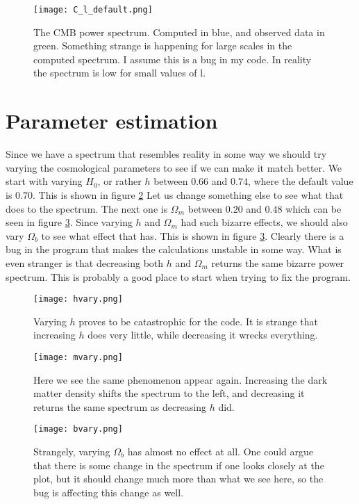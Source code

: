 \documentclass[a4paper]{report}
\begin{document}
\begin{figure}[ht]
 \texttt{[image: C\_l\_default.png]}
 \caption{The CMB power spectrum. Computed in blue, and observed data in green. Something strange is happening for large scales in the computed spectrum. I assume this is a bug in my code. In reality the spectrum is low for small values of l.}
 \label{fig:Cl}
\end{figure}

\section{Parameter estimation}\label{sec:param}
Since we have a spectrum that resembles reality in some way we should try varying the cosmological parameters to see if we can make it match better. We start with varying $H_0$, or rather $h$ between $0.66$ and $0.74$, where the default value is $0.70$. This is shown in figure \ref{fig:hvary}
Let us change something else to see what that does to the spectrum. The next one is $\Omega_m$ between $0.20$ and $0.48$ which can be seen in figure \ref{fig:mvary}.
Since varying $h$ and $\Omega_m$ had such bizarre effects, we should also vary $\Omega_b$ to see what effect that has. This is shown in figure \ref{fig:mvary}. Clearly there is a bug in the program that makes the calculations unstable in some way. What is even stranger is that decreasing both $h$ and $\Omega_m$ returns the same bizarre power spectrum. This is probably a good place to start when trying to fix the program.

\begin{figure}[ht]
 \texttt{[image: hvary.png]}
 \caption{Varying $h$ proves to be catastrophic for the code. It is strange that increasing $h$ does very little, while decreasing it wrecks everything.}
 \label{fig:hvary}
\end{figure}


\begin{figure}[ht]
 \texttt{[image: mvary.png]}
 \caption{Here we see the same phenomenon appear again. Increasing the dark matter density shifts the spectrum to the left, and decreasing it returns the same spectrum as decreasing $h$ did.}
 \label{fig:mvary}
\end{figure}


\begin{figure}[ht]
 \texttt{[image: bvary.png]}
 \caption{Strangely, varying $\Omega_b$ has almost no effect at all. One could argue that there is some change in the spectrum if one looks closely at the plot, but it should change much more than what we see here, so the bug is affecting this change as well.}
 \label{fig:bvary}
\end{figure}
\end{document}

